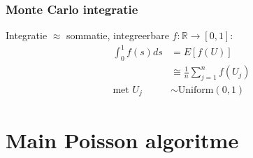 \documentclass[18pt,aspectratio=149]{beamer}
\begin{document}
\begin{frame}
    \frametitle{Monte Carlo integratie}
    Integratie $\approx$ sommatie, integreerbare $f: \mathbb{R} \rightarrow [0,1]$:
    \begin{align}
        \int_{0}^{1} f(s) ds & = E[f(U)]                                 \\
                             & \cong \frac{1}{n} \sum_{j=1}^{n} f(U_{j}) \\
        \text{met } U_{j}    & \sim \text{Uniform}(0,1)
    \end{align}
\end{frame}


\section{Main Poisson algoritme}

\begin{frame}
    \tableofcontentscurrent
\end{frame}
\end{document}
